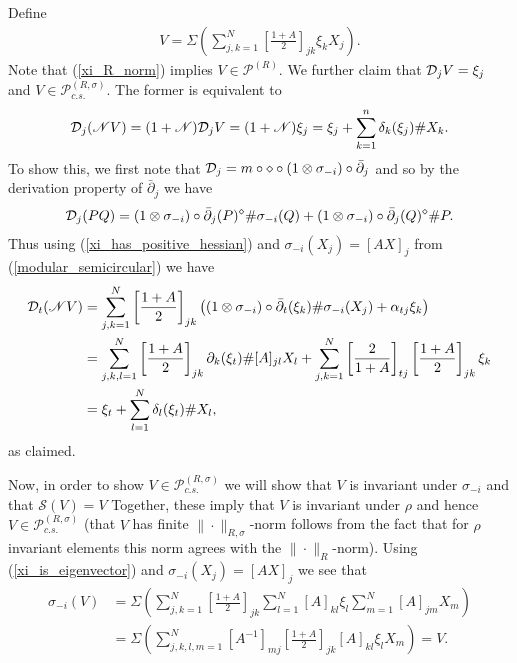 Define
	\begin{align*}
		V = \Sigma\left(\sum_{j,k=1}^N \left[\frac{1+A}{2}\right]_{jk} \xi_k X_j\right).
	\end{align*}
Note that (\ref{xi_R_norm}) implies $V\in\mathscr{P}^{(R)}$. We further claim that $\mathcal D_j V=\xi_j$ and $V\in\mathscr{P}_{c.s.}^{(R,\sigma)}$. The former is equivalent to
	\begin{align*}
		\mathcal D_j(\mathscr{N}V)=(1+\mathscr{N})\mathcal D_j V=(1+\mathscr{N})\xi_j= \xi_j+\sum_{k=1}^n \delta_k(\xi_j)\# X_k.
	\end{align*}
To show this, we first note that $\mathcal D_j=m\circ\diamond\circ(1\otimes\sigma_{-i})\circ\bar{\partial}_j$ and so by the derivation property of $\bar{\partial}_j$ we have
	\begin{align*}
		\mathcal D_j(PQ)= (1\otimes\sigma_{-i})\circ\bar{\partial}_j(P)^\diamond \# \sigma_{-i}(Q) + (1\otimes\sigma_{-i})\circ\bar{\partial}_j(Q)^\diamond\#P.
	\end{align*}
Thus using (\ref{xi_has_positive_hessian}) and $\sigma_{-i}(X_j)=[A X]_j$ from (\ref{modular_semicircular}) we have
	\begin{align*}
		\mathcal D_t(\mathscr{N}V)&=\sum_{j,k=1}^N \left[\frac{1+A}{2}\right]_{jk} \left( (1\otimes\sigma_{-i})\circ\bar{\partial}_t(\xi_k)\# \sigma_{-i}(X_j) + \alpha_{tj} \xi_k\right)\\
			&=\sum_{j,k,l=1}^N \left[\frac{1+A}{2}\right]_{jk} \partial_k(\xi_t)\# [A]_{jl}X_l + \sum_{j,k=1}^N \left[\frac{2}{1+A}\right]_{tj}\left[\frac{1+A}{2}\right]_{jk} \xi_k\\
			&= \xi_t+\sum_{l=1}^N \delta_l(\xi_t)\# X_l,
	\end{align*}
as claimed.\par
Now, in order to show $V\in\mathscr{P}_{c.s.}^{(R,\sigma)}$ we will show that $V$ is invariant under $\sigma_{-i}$ and that $\mathscr{S}(V)=V$ Together, these imply that $V$ is invariant under $\rho$ and hence $V\in\mathscr{P}_{c.s.}^{(R,\sigma)}$ (that $V$ has finite $\|\cdot\|_{R,\sigma}$-norm follows from the fact that for $\rho$ invariant elements this norm agrees with the $\|\cdot\|_R$-norm). Using (\ref{xi_is_eigenvector}) and $\sigma_{-i}(X_j)=[A X]_j$ we see that
	\begin{align*}
		\sigma_{-i}(V)&=\Sigma\left( \sum_{j,k=1}^N \left[\frac{1+A}{2}\right]_{jk} \sum_{l=1}^N [A]_{kl} \xi_l \sum_{m=1}^N [A]_{jm} X_m\right)\\
				&=\Sigma\left( \sum_{j,k,l,m=1}^N \left[A^{-1}\right]_{mj}\left[\frac{1+A}{2}\right]_{jk}[A]_{kl} \xi_l X_m\right) = V.
	\end{align*}
